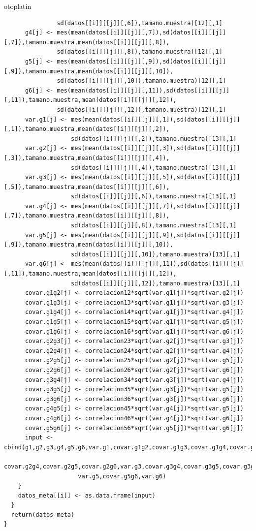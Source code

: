 otoplatin\documentclass[a4paper,openright,12pt]{report}
\begin{document}
{\begin{verbatim}
               sd(datos[[i]][[j]][,6]),tamano.muestra)[12][,1]
      g4[j] <- mes(mean(datos[[i]][[j]][,7]),sd(datos[[i]][[j]][,7]),tamano.muestra,mean(datos[[i]][[j]][,8]),
               sd(datos[[i]][[j]][,8]),tamano.muestra)[12][,1]
      g5[j] <- mes(mean(datos[[i]][[j]][,9]),sd(datos[[i]][[j]][,9]),tamano.muestra,mean(datos[[i]][[j]][,10]),
               sd(datos[[i]][[j]][,10]),tamano.muestra)[12][,1]
      g6[j] <- mes(mean(datos[[i]][[j]][,11]),sd(datos[[i]][[j]][,11]),tamano.muestra,mean(datos[[i]][[j]][,12]),
               sd(datos[[i]][[j]][,12]),tamano.muestra)[12][,1]
      var.g1[j] <- mes(mean(datos[[i]][[j]][,1]),sd(datos[[i]][[j]][,1]),tamano.muestra,mean(datos[[i]][[j]][,2]),
                   sd(datos[[i]][[j]][,2]),tamano.muestra)[13][,1]
      var.g2[j] <- mes(mean(datos[[i]][[j]][,3]),sd(datos[[i]][[j]][,3]),tamano.muestra,mean(datos[[i]][[j]][,4]),
                   sd(datos[[i]][[j]][,4]),tamano.muestra)[13][,1]
      var.g3[j] <- mes(mean(datos[[i]][[j]][,5]),sd(datos[[i]][[j]][,5]),tamano.muestra,mean(datos[[i]][[j]][,6]),
                   sd(datos[[i]][[j]][,6]),tamano.muestra)[13][,1]
      var.g4[j] <- mes(mean(datos[[i]][[j]][,7]),sd(datos[[i]][[j]][,7]),tamano.muestra,mean(datos[[i]][[j]][,8]),
                   sd(datos[[i]][[j]][,8]),tamano.muestra)[13][,1]
      var.g5[j] <- mes(mean(datos[[i]][[j]][,9]),sd(datos[[i]][[j]][,9]),tamano.muestra,mean(datos[[i]][[j]][,10]),
                   sd(datos[[i]][[j]][,10]),tamano.muestra)[13][,1]
      var.g6[j] <- mes(mean(datos[[i]][[j]][,11]),sd(datos[[i]][[j]][,11]),tamano.muestra,mean(datos[[i]][[j]][,12]),
                   sd(datos[[i]][[j]][,12]),tamano.muestra)[13][,1]
      covar.g1g2[j] <- correlacion12*sqrt(var.g1[j])*sqrt(var.g2[j])
      covar.g1g3[j] <- correlacion13*sqrt(var.g1[j])*sqrt(var.g3[j])
      covar.g1g4[j] <- correlacion14*sqrt(var.g1[j])*sqrt(var.g4[j])
      covar.g1g5[j] <- correlacion15*sqrt(var.g1[j])*sqrt(var.g5[j])
      covar.g1g6[j] <- correlacion16*sqrt(var.g1[j])*sqrt(var.g6[j])
      covar.g2g3[j] <- correlacion23*sqrt(var.g2[j])*sqrt(var.g3[j])
      covar.g2g4[j] <- correlacion24*sqrt(var.g2[j])*sqrt(var.g4[j])
      covar.g2g5[j] <- correlacion25*sqrt(var.g2[j])*sqrt(var.g5[j])
      covar.g2g6[j] <- correlacion26*sqrt(var.g2[j])*sqrt(var.g6[j])
      covar.g3g4[j] <- correlacion34*sqrt(var.g3[j])*sqrt(var.g4[j])
      covar.g3g5[j] <- correlacion35*sqrt(var.g3[j])*sqrt(var.g5[j])
      covar.g3g6[j] <- correlacion36*sqrt(var.g3[j])*sqrt(var.g6[j])
      covar.g4g5[j] <- correlacion45*sqrt(var.g4[j])*sqrt(var.g5[j])
      covar.g4g6[j] <- correlacion46*sqrt(var.g4[j])*sqrt(var.g6[j])
      covar.g5g6[j] <- correlacion56*sqrt(var.g5[j])*sqrt(var.g6[j])
      input <- cbind(g1,g2,g3,g4,g5,g6,var.g1,covar.g1g2,covar.g1g3,covar.g1g4,covar.g1g5,covar.g1g6,var.g2,covar.g2g3,
                     covar.g2g4,covar.g2g5,covar.g2g6,var.g3,covar.g3g4,covar.g3g5,covar.g3g6,var.g4,covar.g4g5,covar.g4g6,
                     var.g5,covar.g5g6,var.g6)
    }
    datos_meta[[i]] <- as.data.frame(input)
  }
  return(datos_meta)
}
\end{verbatim}}
\end{document}

